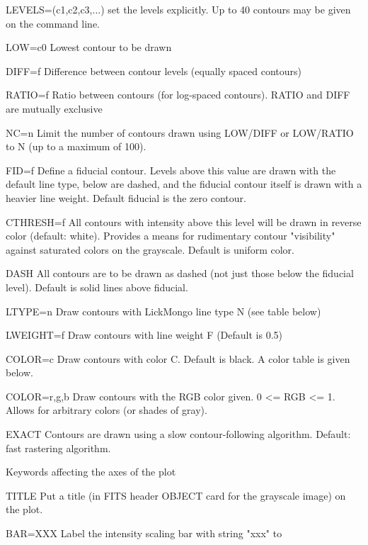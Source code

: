 {\begin{command}
  \item[LEVELS=(c1,c2,c3,...)]{set the levels explicitly.  Up to 40 contours 
       may be given on the command line.}
  \item[LOW=c0]{Lowest contour to be drawn}
  \item[DIFF=f]{Difference between contour levels (equally spaced contours)}
  \item[RATIO=f]{Ratio between contours (for log-spaced contours).  RATIO
                 and DIFF are mutually exclusive}
  \item[NC=n]{Limit the number of contours drawn using LOW/DIFF or 
                  LOW/RATIO to N (up to a maximum of 100).}
  \item[FID=f]{Define a fiducial contour.  Levels above this value are
                  drawn with the default line type, below are dashed, and
                  the fiducial contour itself is drawn with a heavier
                  line weight.  Default fiducial is the zero contour.}
  \item[CTHRESH=f]{All contours with intensity above this level will be
                  drawn in reverse color (default: white).  Provides a means
                  for rudimentary contour "visibility" against saturated
                  colors on the grayscale.  Default is uniform color.}
  \item[DASH]{All contours are to be drawn as dashed (not just those below
              the fiducial level).  Default is solid lines above fiducial.}
  \item[LTYPE=n ]{Draw contours with LickMongo line type N (see table below)}
  \item[LWEIGHT=f]{Draw contours with line weight F (Default is 0.5)}
  \item[COLOR=c]{Draw contours with color C.  Default is black.  A color table 
                 is given below.}
  \item[COLOR=r,g,b]{ Draw contours with the RGB color given.  0 <= RGB <= 1.  
               Allows for arbitrary colors (or shades of gray).}
  \item[EXACT]{Contours are drawn using a slow contour-following algorithm.
               Default: fast rastering algorithm.}
  \item[Keywords affecting the axes of the plot\hfill]{}
  \item[TITLE  ]{Put a title (in FITS header OBJECT card for the grayscale 
                 image) on the plot.}
  \item[BAR=XXX ]{Label the intensity scaling bar with string "xxx" to 
}
\end{command}}
